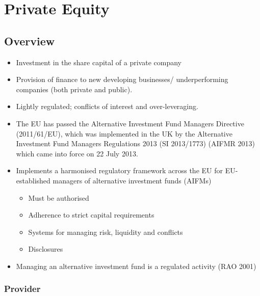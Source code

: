 \documentclass[
]{article}
\providecommand{\tightlist}{%
  \setlength{\itemsep}{0pt}\setlength{\parskip}{0pt}}
\begin{document}
\hypertarget{private-equity}{%
\section{Private Equity}\label{private-equity}}

\hypertarget{overview}{%
\subsection{Overview}\label{overview}}

\begin{itemize}
\tightlist
\item
  Investment in the share capital of a private company
\item
  Provision of finance to new developing businesses/ underperforming
  companies (both private and public).
\item
  Lightly regulated; conflicts of interest and over-leveraging.
\item
  The EU has passed the Alternative Investment Fund Managers Directive
  (2011/61/EU), which was implemented in the UK by the Alternative
  Investment Fund Managers Regulations 2013 (SI 2013/1773) (AIFMR 2013)
  which came into force on 22 July 2013.
\item
  Implements a harmonised regulatory framework across the EU for
  EU-established managers of alternative investment funds (AIFMs)

  \begin{itemize}
  \tightlist
  \item
    Must be authorised
  \item
    Adherence to strict capital requirements
  \item
    Systems for managing risk, liquidity and conflicts
  \item
    Disclosures
  \end{itemize}
\item
  Managing an alternative investment fund is a regulated activity (RAO
  2001)
\end{itemize}

\hypertarget{provider}{%
\subsubsection{Provider}\label{provider}}
\end{document}
